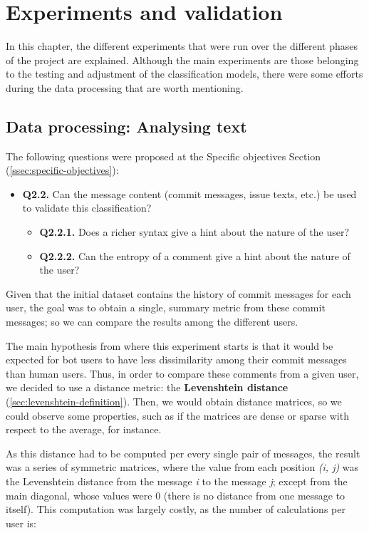 \documentclass[a4paper, 12pt]{book}
\begin{document}
\chapter{Experiments and validation}
\label{chap:experiments}

In this chapter, the different experiments that were run over the different phases of the project are explained. Although the main experiments are those belonging to the testing and adjustment of the classification models, there were some efforts during the data processing that are worth mentioning.

\section{Data processing: Analysing text}
\label{sec:exp-text-richness}

The following questions were proposed at the Specific objectives Section (\ref{ssec:specific-objectives}): 
\begin{itemize}
    \item \textbf{Q2.2.} Can the message content (commit messages, issue texts, etc.) be used to validate this classification?
    \begin{itemize}
        \item \textbf{Q2.2.1.} Does a richer syntax give a hint about the nature of the user? 
        \item \textbf{Q2.2.2.} Can the entropy of a comment give a hint about the nature of the user?
    \end{itemize}
\end{itemize}

Given that the initial dataset contains the history of commit messages for each user, the goal was to obtain a single, summary metric from these commit messages; so we can compare the results among the different users.

The main hypothesis from where this experiment starts is that it would be expected for bot users to have less dissimilarity among their commit messages than human users. Thus, in order to compare these comments from a given user, we decided to use a distance metric: the \textbf{Levenshtein distance} (\ref{sec:levenshtein-definition}). Then, we would obtain distance matrices, so we could observe some properties, such as if the matrices are dense or sparse with respect to the average, for instance.

As this distance had to be computed per every single pair of messages, the result was a series of symmetric matrices, where the value from each position \textit{(i, j)} was the Levenshtein distance from the message \textit{i} to the message \textit{j}; except from the main diagonal, whose values were $0$ (there is no distance from one message to itself). This computation was largely costly, as the number of calculations per user is:
\end{document}
